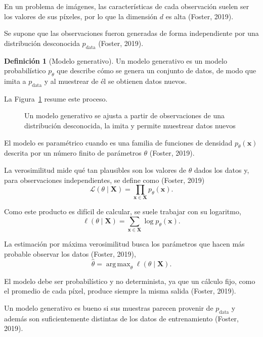 \documentclass[11pt,letterpaper]{article}
\theoremstyle{definition}
\newtheorem{definicion}{Definición}
\newcommand{\bx}{\mathbf{x}}
\newcommand{\bX}{\mathbf{X}}
\newcommand{\pdata}{p_{\text{data}}}
\newcommand{\ptheta}{p_{\theta}}
\DeclareMathOperator*{\argmax}{arg\,max}
\begin{document}
En un problema de imágenes, las características de cada observación suelen ser los valores de sus píxeles, por lo que la dimensión $d$ es alta (Foster, 2019).

Se supone que las observaciones fueron generadas de forma independiente por una distribución desconocida $\pdata$ (Foster, 2019).

\begin{definicion}[Modelo generativo]
Un modelo generativo es un modelo probabilístico $\ptheta$ que describe cómo se genera un conjunto de datos, de modo que imita a $\pdata$ y al muestrear de él se obtienen datos nuevos.
\end{definicion}

La Figura~\ref{fig:proceso} resume este proceso.

\begin{figure}[H]
  \centering
  
  \caption{Un modelo generativo se ajusta a partir de observaciones de una distribución desconocida, la imita y permite muestrear datos nuevos}
  \label{fig:proceso}
\end{figure}

El modelo es paramétrico cuando es una familia de funciones de densidad $\ptheta(\bx)$ descrita por un número finito de parámetros $\theta$ (Foster, 2019).

La verosimilitud mide qué tan plausibles son los valores de $\theta$ dados los datos y, para observaciones independientes, se define como (Foster, 2019)
\begin{equation}
  \mathcal{L}(\theta \mid \bX) = \prod_{\bx \in \bX} \ptheta(\bx).
\end{equation}

Como este producto es difícil de calcular, se suele trabajar con su logaritmo,
\begin{equation}
  \ell(\theta \mid \bX) = \sum_{\bx \in \bX} \log \ptheta(\bx).
\end{equation}

La estimación por máxima verosimilitud busca los parámetros que hacen más probable observar los datos (Foster, 2019),
\begin{equation}
  \hat{\theta} = \argmax_{\theta} \ell(\theta \mid \bX).
\end{equation}

El modelo debe ser probabilístico y no determinista, ya que un cálculo fijo, como el promedio de cada píxel, produce siempre la misma salida (Foster, 2019).

Un modelo generativo es bueno si sus muestras parecen provenir de $\pdata$ y además son suficientemente distintas de los datos de entrenamiento (Foster, 2019).
\end{document}
